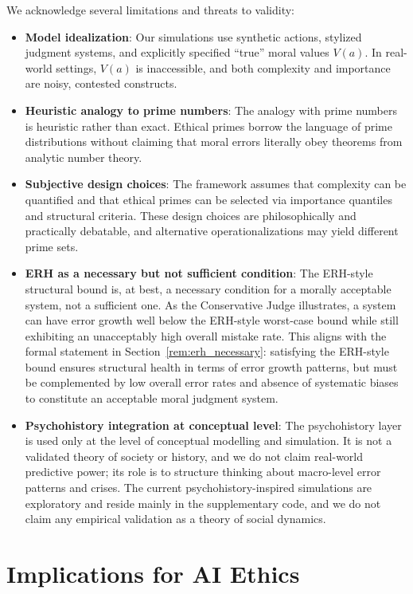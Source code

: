 \documentclass[12pt,a4paper]{article}
\theoremstyle{definition}
\theoremstyle{remark}
\begin{document}
We acknowledge several limitations and threats to validity:
\begin{itemize}
    \item \textbf{Model idealization}: Our simulations use synthetic actions, stylized judgment systems, and explicitly specified ``true'' moral values $V(a)$. In real-world settings, $V(a)$ is inaccessible, and both complexity and importance are noisy, contested constructs.
    \item \textbf{Heuristic analogy to prime numbers}: The analogy with prime numbers is heuristic rather than exact. Ethical primes borrow the language of prime distributions without claiming that moral errors literally obey theorems from analytic number theory.
    \item \textbf{Subjective design choices}: The framework assumes that complexity can be quantified and that ethical primes can be selected via importance quantiles and structural criteria. These design choices are philosophically and practically debatable, and alternative operationalizations may yield different prime sets.
    \item \textbf{ERH as a necessary but not sufficient condition}: The ERH-style structural bound is, at best, a necessary condition for a morally acceptable system, not a sufficient one. As the Conservative Judge illustrates, a system can have error growth well below the ERH-style worst-case bound while still exhibiting an unacceptably high overall mistake rate. This aligns with the formal statement in Section~\ref{rem:erh_necessary}: satisfying the ERH-style bound ensures structural health in terms of error growth patterns, but must be complemented by low overall error rates and absence of systematic biases to constitute an acceptable moral judgment system.
    \item \textbf{Psychohistory integration at conceptual level}: The psychohistory layer is used only at the level of conceptual modelling and simulation. It is not a validated theory of society or history, and we do not claim real-world predictive power; its role is to structure thinking about macro-level error patterns and crises. The current psychohistory-inspired simulations are exploratory and reside mainly in the supplementary code, and we do not claim any empirical validation as a theory of social dynamics.
\end{itemize}

\section{Implications for AI Ethics}
\label{sec:implications}
\end{document}
